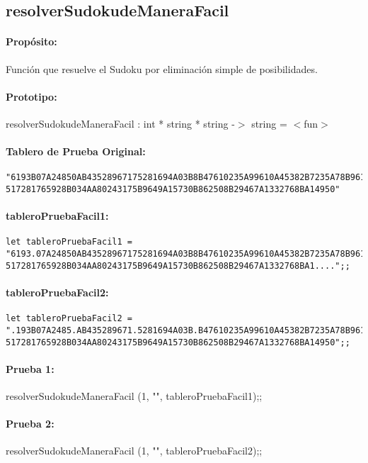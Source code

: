 \subsection{resolverSudokudeManeraFacil}

\paragraph{Propósito:} Función que resuelve el Sudoku por eliminación simple de
posibilidades.
\paragraph{Prototipo:} resolverSudokudeManeraFacil : int * string * string -$>$ string = $<$fun$>$
\paragraph{Tablero de Prueba Original:}
\begin{verbatim}
"6193B07A24850AB43528967175281694A03B8B47610235A99610A45382B7235A78B96104B4390A6
517281765928B034AA80243175B9649A15730B862508B29467A1332768BA14950"
\end{verbatim}
\paragraph{tableroPruebaFacil1:}
\begin{verbatim}
let tableroPruebaFacil1 =
"6193.07A24850AB43528967175281694A03B8B47610235A99610A45382B7235A78B96104B4390A6
517281765928B034AA80243175B9649A15730B862508B29467A1332768BA1....";;
\end{verbatim}
\paragraph{tableroPruebaFacil2:}
\begin{verbatim}
let tableroPruebaFacil2 =
".193B07A2485.AB435289671.5281694A03B.B47610235A99610A45382B7235A78B96104B4390A6
517281765928B034AA80243175B9649A15730B862508B29467A1332768BA14950";;
\end{verbatim}
\paragraph{Prueba 1:} resolverSudokudeManeraFacil (1, "", tableroPruebaFacil1);;
\paragraph{Prueba 2:} resolverSudokudeManeraFacil (1, "", tableroPruebaFacil2);;
